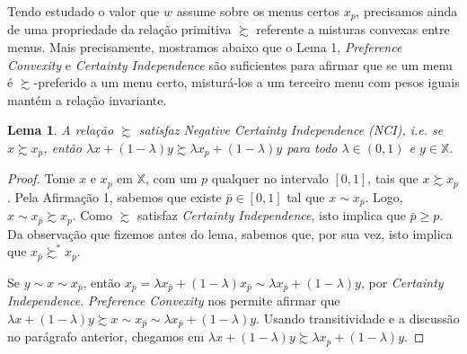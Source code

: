 \documentclass[11pt, a4paper]{article}
\theoremstyle{nonumberplain}
\newtheorem{proof}{Dem.}
\theoremstyle{plain}
\theoremstyle{plain}
\theoremstyle{plain}
\newtheorem{lemma}{Lema}
\begin{document}
Tendo estudado o valor que $w$ assume sobre os menus certos $x_p$, precisamos ainda de uma propriedade da relação primitiva $\succsim$ referente a misturas convexas entre menus. Mais precisamente, mostramos abaixo que o Lema 1, \emph{Preference Convexity} e \emph{Certainty Independence} são suficientes para afirmar que se um menu é $\succsim$-preferido a um menu certo, misturá-los a um terceiro menu com pesos iguais mantém a relação invariante.  

\begin{lemma}\label{NCI}A relação $\succsim$ satisfaz \emph{Negative Certainty Independence (NCI)}, i.e. se $x\succsim x_p$, então $\lambda x +(1-\lambda)y\succsim \lambda x_p +(1-\lambda)y$ para todo $\lambda\in(0,1)$ e $y\in \mathbb{X}$.\end{lemma}
\begin{proof}
Tome $x$ e $x_p$ em $\mathbb{X}$, com um $p$ qualquer no intervalo $[0,1]$, tais que $x\succsim x_p$. Pela Afirmação 1, sabemos que existe $\bar{p}\in [0,1]$ tal que $x\sim x_{\bar{p}}$. Logo, $x\sim x_{\bar{p}}\succsim x_p$. Como $\succsim$ satisfaz \emph{Certainty Independence}, isto implica que $\bar{p}\geq p$. Da observação que fizemos antes do lema, sabemos que, por sua vez, isto implica que $x_{\bar{p}}\succsim^* x_p$.

Se $y\sim x\sim x_{\bar{p}}$, então $x_{\bar{p}}=\lambda x_{\bar{p}} + (1-\lambda)x_{\bar{p}}\sim\lambda x_{\bar{p}}+(1-\lambda)y$, por \emph{Certainty Independence}. \emph{Preference Convexity} nos permite afirmar que $\lambda x+(1-\lambda)y \succsim x \sim x_{\bar{p}} \sim \lambda x_{\bar{p}}+(1-\lambda)y$. Usando transitividade e a discussão no parágrafo anterior, chegamos em $\lambda x+(1-\lambda)y\succsim \lambda x_p + (1-\lambda)y$. 


\end{proof}
\end{document}

